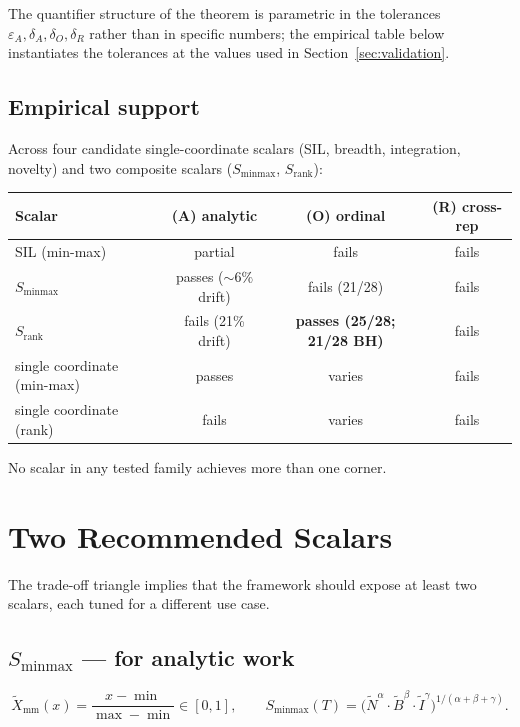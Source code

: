 \documentclass[11pt]{article}
\begin{document}
\noindent The quantifier structure of the theorem is parametric in the tolerances $\varepsilon_A, \delta_A, \delta_O, \delta_R$ rather than in specific numbers; the empirical table below instantiates the tolerances at the values used in Section~\ref{sec:validation}.

\subsection{Empirical support}

Across four candidate single-coordinate scalars (SIL, breadth, integration, novelty) and two composite scalars ($S_{\mathrm{minmax}}$, $S_{\mathrm{rank}}$):

\begin{center}
\begin{tabular}{lccc}
\toprule
Scalar & (A) analytic & (O) ordinal & (R) cross-rep \\
\midrule
SIL (min-max)        & partial            & fails           & fails \\
$S_{\mathrm{minmax}}$ & passes ($\sim 6\%$ drift) & fails (21/28) & fails \\
$S_{\mathrm{rank}}$   & fails (21\% drift) & \textbf{passes (25/28; 21/28 BH)} & fails \\
single coordinate (min-max) & passes & varies & fails \\
single coordinate (rank)    & fails  & varies & fails \\
\bottomrule
\end{tabular}
\end{center}

No scalar in any tested family achieves more than one corner.

\section{Two Recommended Scalars}\label{sec:scalars}

The trade-off triangle implies that the framework should expose at least two scalars, each tuned for a different use case.

\subsection{$S_{\mathrm{minmax}}$ --- for analytic work}

\[
\tilde{X}_{\mathrm{mm}}(x) = \frac{x - \min}{\max - \min} \in [0,1],
\qquad
S_{\mathrm{minmax}}(T) = \bigl(\tilde{N}^\alpha \cdot \tilde{B}^\beta \cdot \tilde{I}^\gamma\bigr)^{1/(\alpha+\beta+\gamma)}.
\]
\end{document}

